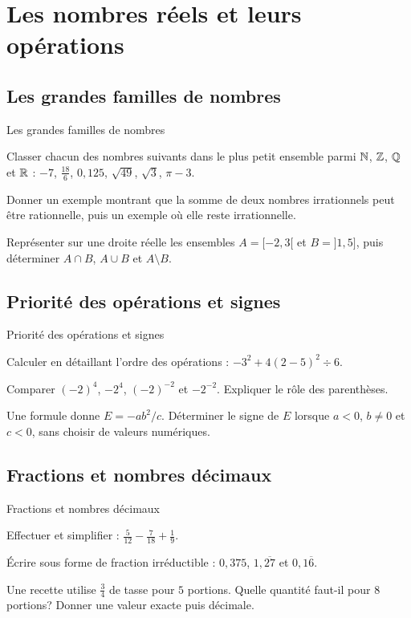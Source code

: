 \chapter{Les nombres réels et leurs opérations}
\label{workbook:chapter:01}
\section{Les grandes familles de nombres}
\label{workbook:section:01.01}
\begin{exerciseblock}{Les grandes familles de nombres}
\item Classer chacun des nombres suivants dans le plus petit ensemble parmi $\mathbb{N}$, $\mathbb{Z}$, $\mathbb{Q}$ et $\mathbb{R}$ : $-7$, $\frac{18}{6}$, $0{,}125$, $\sqrt{49}$, $\sqrt{3}$, $\pi-3$.
\item Donner un exemple montrant que la somme de deux nombres irrationnels peut être rationnelle, puis un exemple où elle reste irrationnelle.
\item Représenter sur une droite réelle les ensembles $A=[-2,3[$ et $B=]1,5]$, puis déterminer $A\cap B$, $A\cup B$ et $A\setminus B$.
\end{exerciseblock}
\section{Priorité des opérations et signes}
\label{workbook:section:01.02}
\begin{exerciseblock}{Priorité des opérations et signes}
\item Calculer en détaillant l'ordre des opérations : $-3^2+4(2-5)^2\div 6$.
\item Comparer $(-2)^4$, $-2^4$, $(-2)^{-2}$ et $-2^{-2}$. Expliquer le rôle des parenthèses.
\item Une formule donne $E=-ab^2/c$. Déterminer le signe de $E$ lorsque $a<0$, $b\neq0$ et $c<0$, sans choisir de valeurs numériques.
\end{exerciseblock}
\section{Fractions et nombres décimaux}
\label{workbook:section:01.03}
\begin{exerciseblock}{Fractions et nombres décimaux}
\item Effectuer et simplifier : $\frac{5}{12}-\frac{7}{18}+\frac{1}{9}$.
\item Écrire sous forme de fraction irréductible : $0{,}375$, $1{,}\overline{27}$ et $0{,}1\overline{6}$.
\item Une recette utilise $\frac34$ de tasse pour $5$ portions. Quelle quantité faut-il pour $8$ portions? Donner une valeur exacte puis décimale.
\end{exerciseblock}
